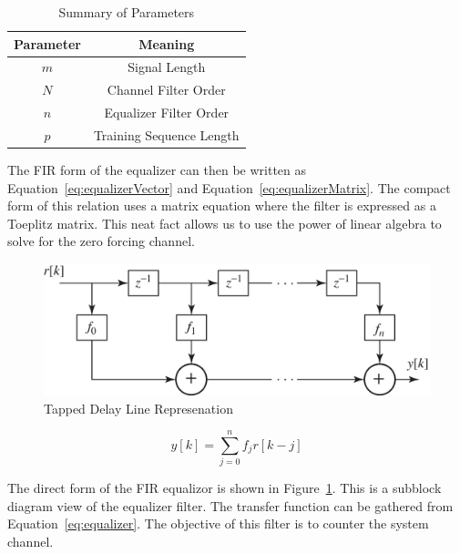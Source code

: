 \documentclass[]{article}
\begin{document}
\begin{table}[b]
\begin{center}
\begin{tabular}{|c|c|}
\hline Parameter & Meaning \\
\hline \hline
$m$ & Signal Length \\ \hline
$N$ & Channel Filter Order \\ \hline
$n$ & Equalizer Filter Order \\ \hline
$p$ & Training Sequence Length \\ \hline
\end{tabular}
\caption{Summary of Parameters} \label{tab:Paramsummary}
\end{center}
\end{table}

The FIR form of the equalizer can then be written as Equation~\ref{eq:equalizerVector} and Equation~\ref{eq:equalizerMatrix}.  The compact form of this relation uses a matrix equation where the filter is expressed as a Toeplitz matrix.  This neat fact allows us to use the power of linear algebra to solve for the zero forcing channel.  
  
 
\begin{figure}[H]
\centering
\includegraphics[width=.6\textwidth]{tapEqualizer.png}
\caption{Tapped Delay Line Represenation\label{fig:tap}}
\end{figure}

\begin{equation}
\label{eq:equalizer}
y\left[k\right] = \sum_{j=0}^n f_jr\left[k-j\right]
\end{equation}

The direct form of the FIR equalizor is shown in Figure~\ref{fig:tap}.  This is a subblock diagram view of the equalizer filter.  The transfer function can be gathered from Equation~\ref{eq:equalizer}.  The objective of this filter is to counter the system channel.  \\
\end{document}
